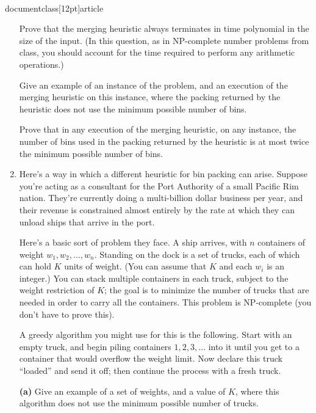 \\documentclass[12pt]{article}
\begin{document}
\begin{enumerate}
Prove that the merging heuristic always terminates in time
polynomial in the size of the input.
(In this question, as in NP-complete number problems from class,
you should account for the time required to perform
any arithmetic operations.)

\bigskip
{} 
Give an example of an instance
of the problem, and an execution of the merging heuristic
on this instance, where the packing returned by
the heuristic does not use the minimum possible number of bins.

\bigskip
{} 
Prove that in any execution of the merging heuristic,
on any instance,
the number of bins used in the packing returned by
the heuristic is at most twice the minimum possible number
of bins.


\item 

Here's a way in which a different heuristic for 
bin packing can arise.
Suppose you're acting as a consultant
for the Port Authority of a small Pacific Rim nation.
They're currently doing a multi-billion dollar business
per year, and their revenue is constrained almost entirely
by the rate at which they can unload ships that arrive in the port.

Here's a basic sort of problem they face.
A ship arrives, with $n$ containers of weight
$w_1, w_2, \ldots, w_n$.
Standing on the dock is a set of trucks, each of
which can hold $K$ units of weight.
(You can assume that $K$ and each $w_i$ is an integer.)
You can stack multiple containers in each truck,
subject to the weight restriction of $K$;
the goal is to minimize the number of trucks that are
needed in order to carry all the containers.
This problem is NP-complete (you don't have to prove this).

A greedy algorithm you might use for this is the following.
Start with an empty truck, and begin piling containers
$1, 2, 3, \ldots $ into it until you get to a container
that would overflow the weight limit.
Now declare this truck ``loaded'' and send it off;
then continue the process with a fresh truck.

{\bf (a)} Give an example of a set of weights, and
a value of $K$, where this algorithm does not use the
minimum possible number of trucks.


\end{enumerate}
\end{document}
